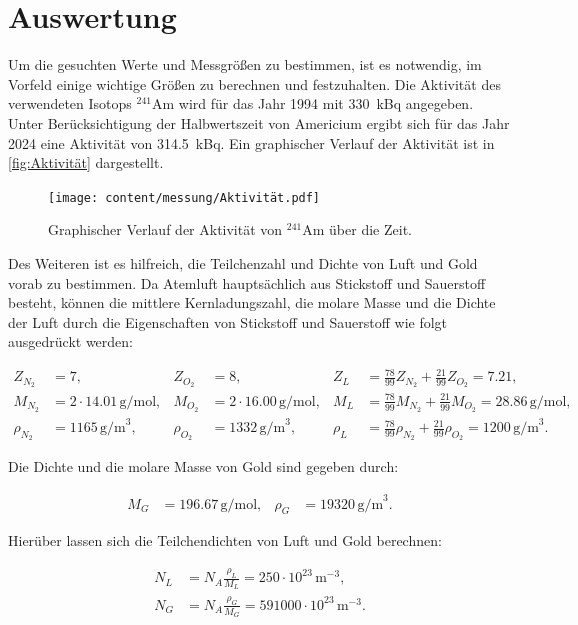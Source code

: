 \section{Auswertung}

Um die gesuchten Werte und Messgrößen zu bestimmen, ist es notwendig, im Vorfeld einige wichtige Größen zu berechnen und festzuhalten.  
Die Aktivität des verwendeten Isotops $^{241}\mathrm{Am}$ wird für das Jahr 1994 mit \SI{330}{\kilo \becquerel} angegeben.  
Unter Berücksichtigung der Halbwertszeit von Americium ergibt sich für das Jahr 2024 eine Aktivität von \SI{314.5}{\kilo \becquerel}.  
Ein graphischer Verlauf der Aktivität ist in \autoref{fig:Aktivität} dargestellt.

\begin{figure}[h!]
    \centering
    \texttt{[image: content/messung/Aktivität.pdf]}
    \caption{Graphischer Verlauf der Aktivität von $^{241}\mathrm{Am}$ über die Zeit.}
    \label{fig:Aktivität}
\end{figure}

Des Weiteren ist es hilfreich, die Teilchenzahl und Dichte von Luft und Gold vorab zu bestimmen.  
Da Atemluft hauptsächlich aus Stickstoff und Sauerstoff besteht, können die mittlere Kernladungszahl, die molare Masse und die Dichte der Luft  
durch die Eigenschaften von Stickstoff und Sauerstoff wie folgt ausgedrückt werden:

\begin{align*}
Z_{N_2} &= 7, & Z_{O_2} &= 8, & Z_L &= \frac{78}{99} Z_{N_2} + \frac{21}{99} Z_{O_2} = 7.21, \\
M_{N_2} &= 2 \cdot 14.01 \, \text{g/mol}, & M_{O_2} &= 2 \cdot 16.00 \, \text{g/mol}, & M_L &= \frac{78}{99} M_{N_2} + \frac{21}{99} M_{O_2} = 28.86 \, \text{g/mol}, \\
\rho_{N_2} &= 1165 \, \text{g/m}^3, & \rho_{O_2} &= 1332 \, \text{g/m}^3, & \rho_L &= \frac{78}{99} \rho_{N_2} + \frac{21}{99} \rho_{O_2} = 1200 \, \text{g/m}^3.
\end{align*}

Die Dichte und die molare Masse von Gold sind gegeben durch:

\begin{align*}
M_G &= 196.67 \, \text{g/mol}, & \rho_G &= 19320 \, \text{g/m}^3.
\end{align*}

Hierüber lassen sich die Teilchendichten von Luft und Gold berechnen:

\begin{align*}
N_L &= N_A \frac{\rho_L}{M_L} = 250 \cdot 10^{23} \, \text{m}^{-3}, \\
N_G &= N_A \frac{\rho_G}{M_G} = 591000 \cdot 10^{23} \, \text{m}^{-3}.
\end{align*}

